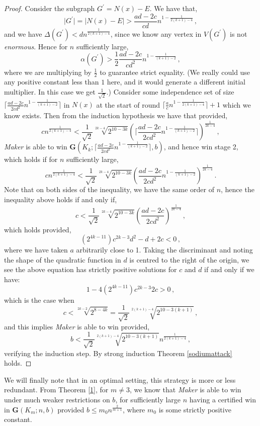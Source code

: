 \documentclass[a4paper,oneside,11pt]{report}
\begin{document}
\begin{proof}
         Consider the subgraph $G^{\prime} = N(x)-E$. We have that,\[\lvert G^{\prime} \rvert = \lvert N(x)-E \rvert > \frac{ad-2c}{cd}n^{1-\frac{1}{2(k+1)-4}}\,,\]and we have $\Delta(G^{\prime}) < dn^{\frac{1}{2(k+1)-4}}$, since we know any vertex in $V(G^{\prime})$ is not \textit{enormous}. Hence for $n$ sufficiently large, \[\alpha(G^{\prime}) > \frac{1}{2}\frac{ad-2c}{cd^2}n^{1-\frac{1}{(k+1)-2}}\,,\]where we are multiplying by $\frac{1}{2}$ to guarantee strict equality. (We really could use any positive constant less than $1$ here, and it would generate a different initial multiplier. In this case we get $\frac{1}{\sqrt{2}}$.) Consider some independence set of size $\lceil \frac{ad-2c}{2cd^2}n^{1-\frac{1}{(k+1)-2}} \rceil$ in $N(x)$ at the start of round $\lceil \frac{a}{c}n^{1-\frac{1}{2(k+1)-4}} \rceil+1$ which we know exists. Then from the induction hypothesis we have that provided, \[cn^{\frac{1}{2(k+1)-4}} < \frac{1}{\sqrt{2}}\sqrt[2k-4]{2^{10-3k}}(\lceil \frac{ad-2c}{2cd^2}n^{1-\frac{1}{(k+1)-2}} \rceil)^{\frac{1}{2k-4}}\,,\] \textit{Maker} is able to win  $\textbf{G}(K_k;\lceil \frac{ad-2c}{2cd^2}n^{1-\frac{1}{(k+1)-2}} \rceil,b)$, and hence win stage 2, which holds if for $n$ sufficiently large,\[cn^{\frac{1}{2(k+1)-4}} < \frac{1}{\sqrt{2}}\sqrt[2k-4]{2^{10-3k}}(\frac{ad-2c}{2cd^2}n^{1-\frac{1}{(k+1)-2}})^{\frac{1}{2k-4}}\,.\] Note that on both sides of the inequality, we have the same order of $n$, hence the inequality above holds if and only if, \[c < \frac{1}{\sqrt{2}}\sqrt[2k-4]{2^{10-3k}}(\frac{ad-2c}{2cd^2})^{\frac{1}{2k-4}}\,,\]which holds provided,\[ (2^{4k-11})c^{2k-3}d^2-d+2c<0\,,\]where we have taken $a$ arbitrarily close to 1. Taking the discriminant and noting the shape of the quadratic function in $d$ is centred to the right of the origin, we see the above equation has strictly positive solutions for $c$ and $d$ if and only if we have: \[1-4(2^{4k-11})c^{2k-3}2c > 0\,,\] which is the case when \[c < \sqrt[2k-2]{2^{8-4k}}=\frac{1}{\sqrt{2}}\sqrt[2(k+1)-4]{2^{10-3(k+1)}}\,,\]and this implies \textit{Maker} is able to win provided, \[b<\frac{1}{\sqrt{2}}\sqrt[2(k+1)-4]{2^{10-3(k+1)}}n^{\frac{1}{2(k+1)-4}}\,,\] verifying the induction step. By strong induction Theorem \ref{sodiumattack} holds.
            
         
    \end{proof}

We will finally note that in an optimal setting, this strategy is more or less redundant. From Theorem \ref{1}, for $m \neq 3$, we know that \textit{Maker} is able to win under much weaker restrictions on $b$, for sufficiently large $n$ having a certified win in $\textbf{G}(K_m;n,b)$ provided $b \leqslant m_0n^{\frac{2}{m+1}}$, where $m_0$ is some strictly positive constant.\\
\end{document}
